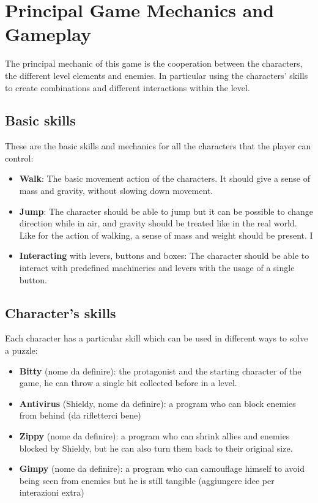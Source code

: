 \documentclass[12pt, a4paper]{report}
\begin{document}
\chapter{Principal Game Mechanics and Gameplay}
The principal mechanic of this game is the cooperation between the characters, the different level elements and enemies. In particular using the characters’ skills to create combinations and different interactions within the level.

\section*{Basic skills}
These are the basic skills and mechanics for all the characters that the player can control:
\begin{itemize}
	\item \textbf{Walk}: The basic movement action of the characters. It should give a sense of mass and gravity, without slowing down movement.
	\item \textbf{Jump}: The character should be able to jump but it can be possible to change direction while in air, and gravity should be treated like in the real world. Like for the action of walking, a sense of mass and weight should be present. 
	I\item \textbf{Interacting} with levers, buttons and boxes: The character should be able to interact with predefined machineries and levers with the usage of a single button.
\end{itemize}
\section*{Character’s skills}
Each character has a particular skill which can be used in different ways to solve a puzzle:
\begin{itemize}
\item \textbf{Bitty} (nome da definire): the protagonist and the starting character of the game, he can throw a single bit collected before in a level.
\item \textbf{Antivirus} (Shieldy, nome da definire): a program who can block enemies from behind (da rifletterci bene)
\item \textbf{Zippy} (nome da definire): a program who can shrink allies and enemies blocked by Shieldy, but he can also turn them back to their original size.
\item \textbf{Gimpy} (nome da definire): a program who can camouflage himself to avoid being seen from enemies but he is still tangible (aggiungere idee per interazioni extra)	
\end{itemize}
\end{document}
